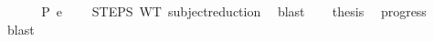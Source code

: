 \begin{isabellebody}
%
\isadelimproof
%
\endisadelimproof
%
\isatagproof
{}\isamarkupfalse%
\ {\isacharminus}{\kern0pt}\isanewline
\ \ \isamarkupfalse%
\ {\isachardoublequoteopen}{\isacharbrackleft}{\kern0pt}{\isacharbrackright}{\kern0pt}\ {\isasymturnstile}{\isacharbraceleft}{\kern0pt}P{\isacharbraceright}{\kern0pt}\ e{\isacharprime}{\kern0pt}\ {\isacharcolon}{\kern0pt}\ {\isasymtau}{\isachardoublequoteclose}\ \isamarkupfalse%
\ STEPS\ WT\ subject{\isacharunderscore}{\kern0pt}reduction{\isacharprime}{\kern0pt}\ \isamarkupfalse%
\ blast\isanewline
\ \ \isamarkupfalse%
\ {\isacharquery}{\kern0pt}thesis\ \isamarkupfalse%
\ progress{\isacharprime}{\kern0pt}\ \isamarkupfalse%
\ blast\isanewline
{}\isamarkupfalse%
%
\endisatagproof
{\isafoldproof}%
%
\isadelimproof
\isanewline
%
\endisadelimproof
\isanewline
%
\isadelimtheory
\isanewline
%
\endisadelimtheory
%
\isatagtheory
{}\isamarkupfalse%
%
\endisatagtheory
{\isafoldtheory}%
%
\isadelimtheory
%
\endisadelimtheory
%
\end{isabellebody}%
\endinput
